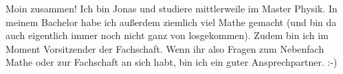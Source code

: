 \begin{multicols}{2}
{
Moin zusammen! Ich bin Jonas und studiere mittlerweile im Master Physik. In meinem Bachelor habe ich außerdem ziemlich viel Mathe gemacht (und bin da auch eigentlich immer noch nicht ganz von losgekommen). 
Zudem bin ich im Moment Vorsitzender der Fachschaft. Wenn ihr also Fragen zum Nebenfach Mathe oder zur Fachschaft an sich habt, bin ich ein guter Ansprechpartner. :-)
}


\end{multicols}

